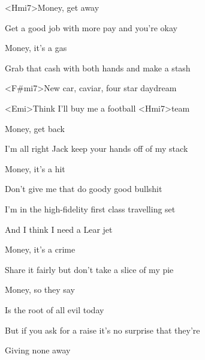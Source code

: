 
\zs

<Hmi7>Money, get away

Get a good job with more pay and you're okay

Money, it's a gas

Grab that cash with both hands and make a stash
\ks

\zr
<F#mi7>New car, caviar, four star daydream

<Emi>Think I'll buy me a football <Hmi7>team
\kr

\zs
Money, get back

I'm all right Jack keep your hands off of my stack

Money, it's a hit

Don't give me that do goody good bullshit
\ks

\zr
I'm in the high-fidelity first class travelling set

And I think I need a Lear jet
\kr

\zs
Money, it's a crime

Share it fairly but don't take a slice of my pie

Money, so they say

Is the root of all evil today

\ks

\zr
But if you ask for a raise it's no surprise that they're

Giving none away
\kr

\kp





